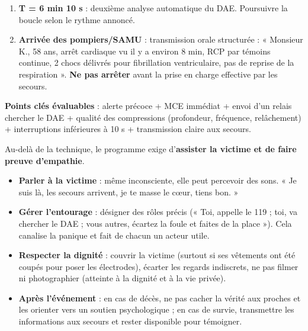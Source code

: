 \documentclass[11pt]{article}
\newcounter{popsec}
\newcounter{popsub}
\newcommand{\courssub}[1]{%
  \stepcounter{popsub}%
  \par\vspace{9pt}\noindent{\popxbold\fontsize{11.5}{13}\selectfont\color{popink}{\color{poporange}\thepopsec.\thepopsub}\hspace{6pt}#1}\par\nopagebreak\vspace{4pt}
}
\begin{document}
\begin{exoresolu}
\begin{enumerate}
    \item \textbf{T = 6 min 10 s} : deuxième analyse automatique du DAE. Poursuivre la boucle selon le rythme annoncé.
    \item \textbf{Arrivée des pompiers/SAMU} : transmission orale structurée : « Monsieur K., 58 ans, arrêt cardiaque vu il y a environ 8 min, RCP par témoins continue, 2 chocs délivrés pour fibrillation ventriculaire, pas de reprise de la respiration ». \textbf{Ne pas arrêter} avant la prise en charge effective par les secours.
\end{enumerate}
\textbf{Points clés évaluables} : alerte précoce + MCE immédiat + envoi d'un relais chercher le DAE + qualité des compressions (profondeur, fréquence, relâchement) + interruptions inférieures à 10 s + transmission claire aux secours.
\end{exoresolu}

\begin{exemplebox}
Au-delà de la technique, le programme exige d'\textbf{assister la victime et de faire preuve d'empathie}.
\begin{itemize}
    \item \textbf{Parler à la victime} : même inconsciente, elle peut percevoir des sons. « Je suis là, les secours arrivent, je te masse le cœur, tiens bon. »
    \item \textbf{Gérer l'entourage} : désigner des rôles précis (« Toi, appelle le 119 ; toi, va chercher le DAE ; vous autres, écartez la foule et faites de la place »). Cela canalise la panique et fait de chacun un acteur utile.
    \item \textbf{Respecter la dignité} : couvrir la victime (surtout si ses vêtements ont été coupés pour poser les électrodes), écarter les regards indiscrets, ne pas filmer ni photographier (atteinte à la dignité et à la vie privée).
    \item \textbf{Après l'événement} : en cas de décès, ne pas cacher la vérité aux proches et les orienter vers un soutien psychologique ; en cas de survie, transmettre les informations aux secours et rester disponible pour témoigner.
\end{itemize}
\end{exemplebox}

\courssub{Exercices d'entraînement}
\end{document}
